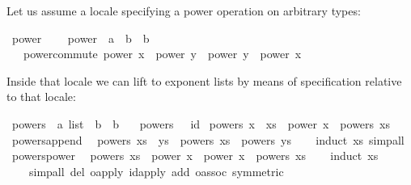 \begin{isabellebody}
\begin{isamarkuptext}
  Let us assume a locale specifying a power operation
  on arbitrary types:%
\end{isamarkuptext}%
\isamarkuptrue%
%
\isadelimquote
%
\endisadelimquote
%
\isatagquote
{}\isamarkupfalse%
\ power\ {\isacharequal}\isanewline
\ \ \ power\ {\isacharcolon}{\isacharcolon}\ {\isachardoublequoteopen}{\isacharprime}a\ {\isasymRightarrow}\ {\isacharprime}b\ {\isasymRightarrow}\ {\isacharprime}b{\isachardoublequoteclose}\isanewline
\ \ \ power{\isacharunderscore}commute{\isacharcolon}\ {\isachardoublequoteopen}power\ x\ {\isasymcirc}\ power\ y\ {\isacharequal}\ power\ y\ {\isasymcirc}\ power\ x{\isachardoublequoteclose}\isanewline
{}%
\endisatagquote
{\isafoldquote}%
%
\isadelimquote
%
\endisadelimquote
%
\begin{isamarkuptext}%
\noindent Inside that locale we can lift  to exponent lists
  by means of specification relative to that locale:%
\end{isamarkuptext}%
\isamarkuptrue%
%
\isadelimquote
%
\endisadelimquote
%
\isatagquote
{}\isamarkupfalse%
\ powers\ {\isacharcolon}{\isacharcolon}\ {\isachardoublequoteopen}{\isacharprime}a\ list\ {\isasymRightarrow}\ {\isacharprime}b\ {\isasymRightarrow}\ {\isacharprime}b{\isachardoublequoteclose}\ \isanewline
\ \ {\isachardoublequoteopen}powers\ {\isacharbrackleft}{\isacharbrackright}\ {\isacharequal}\ id{\isachardoublequoteclose}\isanewline
{\isacharbar}\ {\isachardoublequoteopen}powers\ {\isacharparenleft}x\ {\isacharhash}\ xs{\isacharparenright}\ {\isacharequal}\ power\ x\ {\isasymcirc}\ powers\ xs{\isachardoublequoteclose}\isanewline
\isanewline
{}\isamarkupfalse%
\ powers{\isacharunderscore}append{\isacharcolon}\isanewline
\ \ {\isachardoublequoteopen}powers\ {\isacharparenleft}xs\ {\isacharat}\ ys{\isacharparenright}\ {\isacharequal}\ powers\ xs\ {\isasymcirc}\ powers\ ys{\isachardoublequoteclose}\isanewline
\ \ \isamarkupfalse%
\ {\isacharparenleft}induct\ xs{\isacharparenright}\ simp{\isacharunderscore}all\isanewline
\isanewline
{}\isamarkupfalse%
\ powers{\isacharunderscore}power{\isacharcolon}\isanewline
\ \ {\isachardoublequoteopen}powers\ xs\ {\isasymcirc}\ power\ x\ {\isacharequal}\ power\ x\ {\isasymcirc}\ powers\ xs{\isachardoublequoteclose}\isanewline
\ \ \isamarkupfalse%
\ {\isacharparenleft}induct\ xs{\isacharparenright}\isanewline
\ \ \ \ {\isacharparenleft}simp{\isacharunderscore}all\ del{\isacharcolon}\ o{\isacharunderscore}apply\ id{\isacharunderscore}apply\ add{\isacharcolon}\ o{\isacharunderscore}assoc\ {\isacharbrackleft}symmetric{\isacharbrackright}{\isacharcomma}\isanewline

\end{isabellebody}
